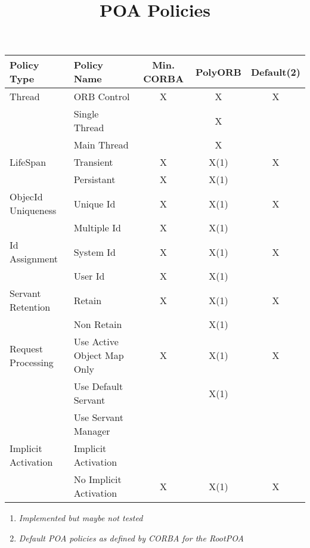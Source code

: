 \documentclass[a4paper,10pt]{article}
\title{POA Policies}
\author{}
\begin{document}
\maketitle
\begin{center}
\begin {tabular}{|l|l|c|c|c|}
\hline
\textbf{Policy Type}&\textbf{Policy Name}&
\textbf{Min. CORBA}&\textbf{PolyORB}&\textbf{Default}(2)\\
\hline
\hline
Thread             &ORB Control               &X&X&X\\
                   &Single Thread             & &X& \\
	           &Main Thread               & &X& \\
\hline
LifeSpan           &Transient                 &X&X(1)&X\\
		   &Persistant                &X&X(1)& \\
\hline
ObjecId Uniqueness &Unique Id                 &X&X(1)&X\\
	           &Multiple Id               &X&X(1)& \\
\hline
Id Assignment      &System Id                 &X&X(1)&X\\
	           &User Id                   &X&X(1)& \\
\hline
Servant Retention  &Retain                    &X&X(1)&X\\
	           &Non Retain                & &X(1)& \\
\hline
Request Processing &Use Active Object Map Only&X&X(1)&X\\
	           &Use Default Servant       & &X(1)& \\
	           &Use Servant Manager       & & & \\
\hline
Implicit Activation&Implicit Activation       & & & \\
	           &No Implicit Activation    &X&X(1)&X\\
\hline
\end{tabular}
\begin{enumerate}
\item \textit{Implemented but maybe not tested}
\item \textit{Default POA policies as defined by CORBA for the RootPOA}
\end{enumerate}
\end{center}
\end{document}
